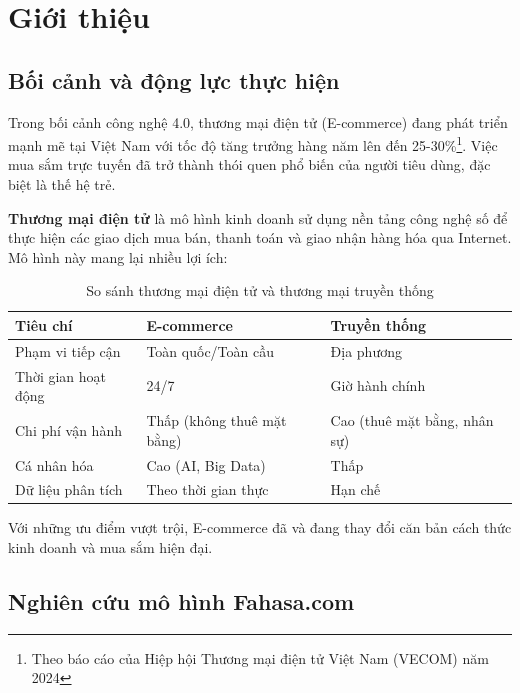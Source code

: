 
\section{Giới thiệu}

\subsection{Bối cảnh và động lực thực hiện}

Trong bối cảnh công nghệ 4.0, thương mại điện tử (E-commerce) đang phát triển mạnh mẽ tại Việt Nam với tốc độ tăng trưởng hàng năm lên đến 25-30\%\footnote{Theo báo cáo của Hiệp hội Thương mại điện tử Việt Nam (VECOM) năm 2024}. Việc mua sắm trực tuyến đã trở thành thói quen phổ biến của người tiêu dùng, đặc biệt là thế hệ trẻ.

\textbf{Thương mại điện tử} là mô hình kinh doanh sử dụng nền tảng công nghệ số để thực hiện các giao dịch mua bán, thanh toán và giao nhận hàng hóa qua Internet. Mô hình này mang lại nhiều lợi ích:

\begin{table}[H]
\centering
\begin{tabular}{|p{4cm}|p{5cm}|p{5cm}|}
\hline
\textbf{Tiêu chí} & \textbf{E-commerce} & \textbf{Truyền thống} \\
\hline
Phạm vi tiếp cận & Toàn quốc/Toàn cầu & Địa phương \\
\hline
Thời gian hoạt động & 24/7 & Giờ hành chính \\
\hline
Chi phí vận hành & Thấp (không thuê mặt bằng) & Cao (thuê mặt bằng, nhân sự) \\
\hline
Cá nhân hóa & Cao (AI, Big Data) & Thấp \\
\hline
Dữ liệu phân tích & Theo thời gian thực & Hạn chế \\
\hline
\end{tabular}
\caption{So sánh thương mại điện tử và thương mại truyền thống}
\label{tab:ecommerce-comparison}
\end{table}

Với những ưu điểm vượt trội, E-commerce đã và đang thay đổi căn bản cách thức kinh doanh và mua sắm hiện đại.

\subsection{Nghiên cứu mô hình Fahasa.com}

